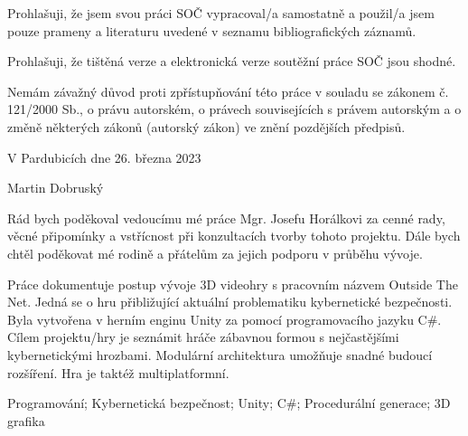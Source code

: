 \documentclass[12pt, a4paper,
 oneside,   
 openright
]{report}
\newcommand\authorName{Martin Dobruský}  %
\begin{document}
\cleardoublepage


\noindent Prohlašuji, že jsem svou práci SOČ vypracoval/a samostatně a použil/a jsem pouze prameny a literaturu uvedené v seznamu bibliografických záznamů.

\noindent Prohlašuji, že tištěná verze a elektronická verze soutěžní práce SOČ jsou shodné. 

\noindent Nemám závažný důvod proti zpřístupňování této práce v souladu se zákonem č. 121/2000 Sb., o právu autorském, o právech souvisejících s právem autorským a o změně některých zákonů (autorský zákon) ve znění pozdějších předpisů. 

\vspace{24 pt}

\noindent V Pardubicích dne 26. března 2023 \dotfill{} 

\hspace{8cm} \authorName

\cleardoublepage

\vspace*{0.8\textheight}

\noindent
Rád bych poděkoval vedoucímu mé práce Mgr. Josefu Horálkovi za cenné rady, věcné připomínky a vstřícnost při konzultacích tvorby tohoto projektu. Dále bych chtěl poděkovat mé rodině a přátelům za jejich podporu v průběhu vývoje.

\cleardoublepage


\noindent Práce dokumentuje postup vývoje 3D videohry s pracovním názvem Outside The Net. Jedná se o hru přibližující aktuální problematiku kybernetické bezpečnosti. Byla vytvořena v herním enginu Unity za pomocí programovacího jazyku C\#. Cílem projektu/hry je seznámit hráče zábavnou formou s nejčastějšími kybernetickými hrozbami. Modulární architektura umožňuje snadné budoucí rozšíření. Hra je taktéž multiplatformní.

\vspace{18pt}


\noindent Programování; Kybernetická bezpečnost; Unity; C\#; Procedurální generace; 3D grafika 

\vspace{18pt}
\end{document}
